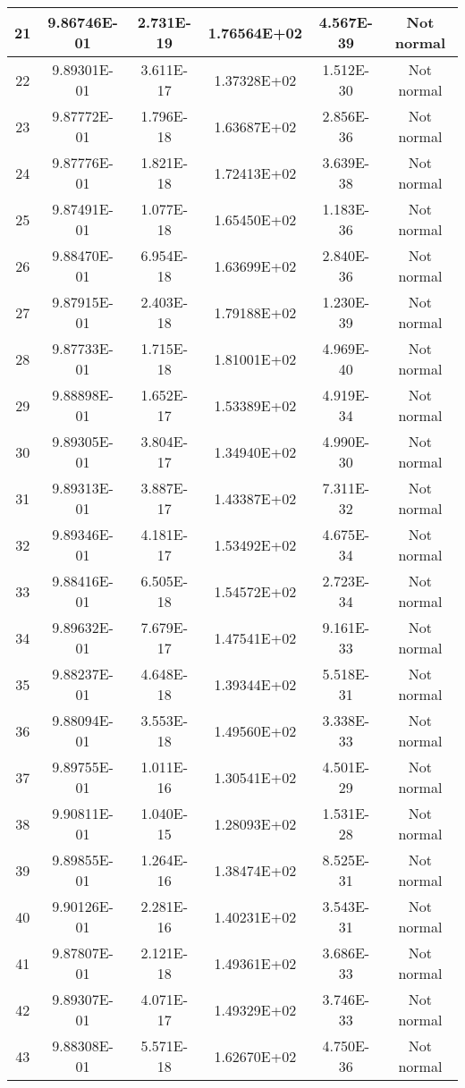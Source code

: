 \begin{table}[h]
\begin{tabular}{|c|c|c|c|c|c|}
		21 & 9.86746E-01 & 2.731E-19 & 1.76564E+02 & 4.567E-39 & Not normal\\\hline
		22 & 9.89301E-01 & 3.611E-17 & 1.37328E+02 & 1.512E-30 & Not normal\\\hline
		23 & 9.87772E-01 & 1.796E-18 & 1.63687E+02 & 2.856E-36 & Not normal\\\hline
		24 & 9.87776E-01 & 1.821E-18 & 1.72413E+02 & 3.639E-38 & Not normal\\\hline
		25 & 9.87491E-01 & 1.077E-18 & 1.65450E+02 & 1.183E-36 & Not normal\\\hline
		26 & 9.88470E-01 & 6.954E-18 & 1.63699E+02 & 2.840E-36 & Not normal\\\hline
		27 & 9.87915E-01 & 2.403E-18 & 1.79188E+02 & 1.230E-39 & Not normal\\\hline
		28 & 9.87733E-01 & 1.715E-18 & 1.81001E+02 & 4.969E-40 & Not normal\\\hline
		29 & 9.88898E-01 & 1.652E-17 & 1.53389E+02 & 4.919E-34 & Not normal\\\hline
		30 & 9.89305E-01 & 3.804E-17 & 1.34940E+02 & 4.990E-30 & Not normal\\\hline
		31 & 9.89313E-01 & 3.887E-17 & 1.43387E+02 & 7.311E-32 & Not normal\\\hline
		32 & 9.89346E-01 & 4.181E-17 & 1.53492E+02 & 4.675E-34 & Not normal\\\hline
		33 & 9.88416E-01 & 6.505E-18 & 1.54572E+02 & 2.723E-34 & Not normal\\\hline
		34 & 9.89632E-01 & 7.679E-17 & 1.47541E+02 & 9.161E-33 & Not normal\\\hline
		35 & 9.88237E-01 & 4.648E-18 & 1.39344E+02 & 5.518E-31 & Not normal\\\hline
		36 & 9.88094E-01 & 3.553E-18 & 1.49560E+02 & 3.338E-33 & Not normal\\\hline
		37 & 9.89755E-01 & 1.011E-16 & 1.30541E+02 & 4.501E-29 & Not normal\\\hline
		38 & 9.90811E-01 & 1.040E-15 & 1.28093E+02 & 1.531E-28 & Not normal\\\hline
		39 & 9.89855E-01 & 1.264E-16 & 1.38474E+02 & 8.525E-31 & Not normal\\\hline
		40 & 9.90126E-01 & 2.281E-16 & 1.40231E+02 & 3.543E-31 & Not normal\\\hline
		41 & 9.87807E-01 & 2.121E-18 & 1.49361E+02 & 3.686E-33 & Not normal\\\hline
		42 & 9.89307E-01 & 4.071E-17 & 1.49329E+02 & 3.746E-33 & Not normal\\\hline
		43 & 9.88308E-01 & 5.571E-18 & 1.62670E+02 & 4.750E-36 & Not normal\\\hline

\end{tabular}
\end{table}
